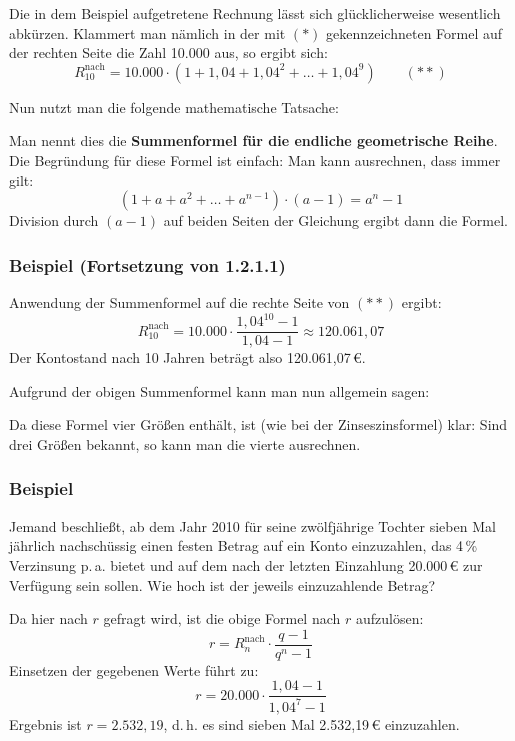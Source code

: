 Die in dem Beispiel aufgetretene Rechnung lässt sich glücklicherweise wesentlich abkürzen. Klammert man nämlich in der mit $(*)$ gekennzeichneten Formel auf der rechten Seite die Zahl 10.000 aus, so ergibt sich:
\[ R_{10}^{\text{nach}} = 10.000 \cdot (1 + 1{,}04 + 1{,}04^2 + \ldots + 1{,}04^9) \qquad (**) \]

Nun nutzt man die folgende mathematische Tatsache:

Man nennt dies die \textbf{Summenformel für die endliche geometrische Reihe}. Die Begründung für diese Formel ist einfach: Man kann ausrechnen, dass immer gilt:
\[ (1 + a + a^2 + \ldots + a^{n-1}) \cdot (a - 1) = a^n - 1 \]
Division durch $(a - 1)$ auf beiden Seiten der Gleichung ergibt dann die Formel.

\subsubsection{Beispiel (Fortsetzung von 1.2.1.1)}

Anwendung der Summenformel auf die rechte Seite von $(**)$ ergibt:
\[ R_{10}^{\text{nach}} = 10.000 \cdot \frac{1{,}04^{10} - 1}{1{,}04 - 1} \approx 120.061{,}07 \]
Der Kontostand nach 10 Jahren beträgt also 120.061{,}07\,€.\beispielende

Aufgrund der obigen Summenformel kann man nun allgemein sagen:

Da diese Formel vier Größen enthält, ist (wie bei der Zinseszinsformel) klar: Sind drei Größen bekannt, so kann man die vierte ausrechnen.

\subsubsection{Beispiel}

Jemand beschließt, ab dem Jahr 2010 für seine zwölfjährige Tochter sieben Mal jährlich nachschüssig einen festen Betrag auf ein Konto einzuzahlen, das 4\,\% Verzinsung p.\,a. bietet und auf dem nach der letzten Einzahlung 20.000\,€ zur Verfügung sein sollen. Wie hoch ist der jeweils einzuzahlende Betrag?

Da hier nach $r$ gefragt wird, ist die obige Formel nach $r$ aufzulösen:
\[ r = R_n^{\text{nach}} \cdot \frac{q - 1}{q^n - 1} \]
Einsetzen der gegebenen Werte führt zu:
\[ r = 20.000 \cdot \frac{1{,}04 - 1}{1{,}04^7 - 1} \]
Ergebnis ist $r = 2.532{,}19$, d.\,h. es sind sieben Mal 2.532{,}19\,€ einzuzahlen.\beispielende

